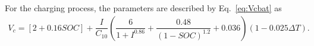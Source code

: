 %
%
For the charging process, the parameters are described by Eq.~\eqref{eq:Vcbat} as
%
\begin{multline}
\label{eq:Vcbat}
V_{c} = [2+0.16SOC]+ \dfrac{I}{C_{10}} \left( \dfrac{6}{1+I^{0.86}} + \dfrac{0.48}{(1-SOC)^{1.2}} + 0.036  \right) (1-0.025 \Delta T).
\end{multline}
%
%
%
